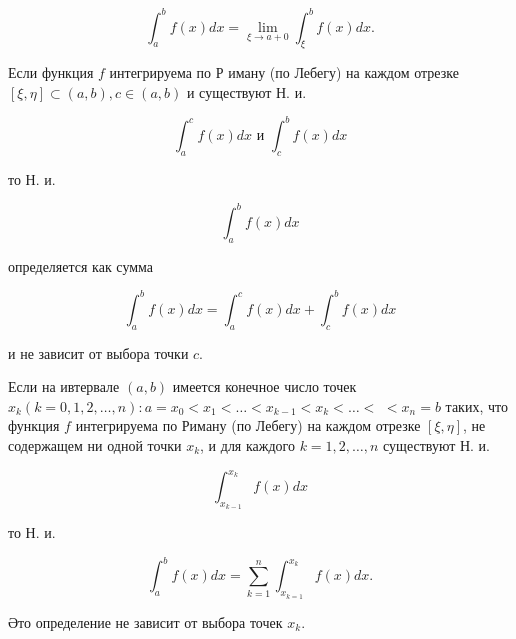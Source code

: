 \documentclass[10pt]{article}
\begin{document}
\[

\int_{a}^{b} f(x) d x=\lim _{\xi \rightarrow a+0} \int_{\xi}^{b} f(x) d x .

\]



Если функция $f$ интегрируема по Р иману (по Лебегу) на каждом отрезке $[\xi, \eta] \subset(a, b), c \in(a, b)$ и существуют Н. и.



\[

\int_{a}^{c} f(x) d x \text { и } \int_{c}^{b} f(x) d x

\]



то Н. и.



\[

\int_{a}^{b} f(x) d x

\]



определяется как сумма



\[

\int_{a}^{b} f(x) d x=\int_{a}^{c} f(x) d x+\int_{c}^{b} f(x) d x

\]



и не зависит от выбора точки $c$.



Если на ивтервале $(a, b)$ имеется конечное число точек $x_{k}(k=0,1,2, \ldots, n): a=x_{0}<x_{1}<\ldots<x_{k-1}<x_{k}<\ldots<$ $<x_{n}=b$ таких, что функция $f$ интегрируема по Риману (по Лебегу) на каждом отрезке $[\xi, \eta]$, не содержащем ни одной точки $x_{k}$, и для каждого $k=1,2, \ldots, n$ существуют Н. и.



\[

\int_{x_{k-1}}^{x_{k}} f(x) d x

\]



то Н. и.



\[

\int_{a}^{b} f(x) d x=\sum_{k=1}^{n} \int_{x_{k=1}}^{x_{k}} f(x) d x .

\]



Әто определение не зависит от выбора точек $x_{k}$.
\end{document}
